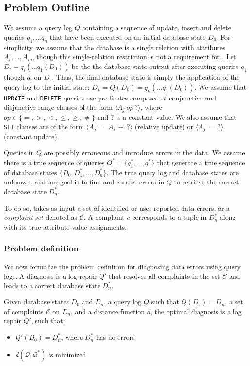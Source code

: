 \subsection{Problem Outline}

We assume a query log $Q$ containing a sequence of update, insert and delete queries 
$q_1, \ldots q_n$  that have been executed on an initial database state $D_0$.  
For simplicity, we assume that the database is a single relation with attributes 
$A_i,\ldots,A_m$, though this single-relation restriction is not a requirement for \sys.
Let $D_i = q_i(\ldots q_1(D_0))$ be the the database state output after executing queries $q_1$ though $q_i$ on $D_0$.
Thus, the final database state is simply the application of the query log to
the initial state: $D_n = Q(D_0) = q_n(\ldots q_1(D_0))$.
We assume that \texttt{UPDATE} and \texttt{DELETE} queries use predicates composed of conjunctive and disjunctive range clauses
of the form $\langle A_j\ op\ ?\rangle$, where $op \in \{=, >, <, \le, \ge, \ne\}$ and $?$ is a constant value.
We also assume that \texttt{SET} clauses are of the form $\langle A_j\ =\ A_i\ +\ ? \rangle$ (relative update) or $\langle A_j\ =\ ?\rangle$ (constant update).

Queries in $Q$ are possibly erroneous and introduce errors in the data.  We assume there is 
a true sequence of queries $Q^* = \{q^*_1,\ldots,q^*_n\}$ that generate a true sequence of database states
$\{D_0, D^*_1,\ldots,D^*_n\}$.  The true query log and database states are unknown, and our goal is to 
find and correct errors in $Q$ to retrieve the correct database state $D^*_n$.

To do so, \sys takes as input a set of identified or user-reported
data errors, or a {\it complaint set} denoted as $\mathcal{C}$. 
A complaint $c$ corresponds to a tuple in $D^*_n$ along with its true attribute value assignments.  



\subsubsection*{Problem definition}

We now formalize the problem definition for diagnosing data
errors using query logs. A diagnosis is a log repair
$Q'$ that resolves all complaints in the set $\mathcal{C}$
and leads to a correct database state $D_n^*$.

\begin{definition}\label{def:problem}
    Given database states $D_0$ and $D_n$, a query log $Q$ 
    such that $Q(D_0)=D_n$, a set of complaints $\mathcal{C}$ on $D_n$,  
    and a distance function $d$, the optimal diagnosis is a 
    log repair $Q'$, such that:
    \begin{itemize}[itemsep=0pt, parsep=0pt]
        \item $Q'(D_0)=D_n^*$, where $D_n^*$ has no errors
        \item $d(\mathcal{Q}, \mathcal{Q}^*)$ is minimized
    \end{itemize}
\end{definition}

